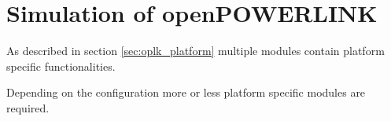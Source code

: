 \chapter{Simulation of openPOWERLINK}
\label{cha:porting}

As described in section \ref{sec:oplk_platform} multiple modules contain platform specific functionalities.

Depending on the configuration more or less platform specific modules are required.